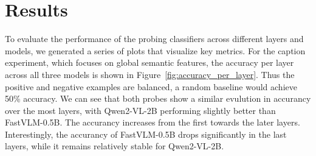 \documentclass[11pt]{article}
\begin{document}
\section{Results}
To evaluate the performance of the probing classifiers across different layers
and models, we generated a series of plots that visualize key metrics.
For the caption experiment, which focuses on global semantic features, the accuracy per layer
across all three models is shown in Figure~\ref{fig:accuracy_per_layer}.
Thus the positive and negative examples are balanced, a random baseline would achieve 50\% accuracy.
We can see that both probes show a similar evulution in accurancy over the most layers, with Qwen2-VL-2B performing slightly better than FastVLM-0.5B.
The accurancy increases from the first towards the later layers.
Interestingly, the accurancy of FastVLM-0.5B drops significantly in the last layers, while it remains relatively stable for Qwen2-VL-2B.
\end{document}
